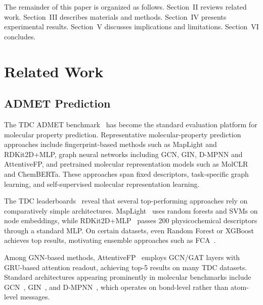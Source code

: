 \documentclass[journal]{IEEEtran}
\begin{document}
The remainder of this paper is organized as follows. Section~II reviews related work. Section~III describes materials and methods. Section~IV presents experimental results. Section~V discusses implications and limitations. Section~VI concludes.

\section{Related Work}
\label{sec:related}

\subsection{ADMET Prediction}

The TDC ADMET benchmark~\cite{huang2021therapeuticsdatacommonsmachine} has become the standard evaluation platform for molecular property prediction. Representative molecular-property prediction approaches include fingerprint-based methods such as MapLight and RDKit2D+MLP, graph neural networks including GCN, GIN, D-MPNN and AttentiveFP, and pretrained molecular representation models such as MolCLR and ChemBERTa. These approaches span fixed descriptors, task-specific graph learning, and self-supervised molecular representation learning.

The TDC leaderboards~\cite{tdc_admet_leaderboard} reveal that several top-performing approaches rely on comparatively simple architectures. MapLight~\cite{maplight} uses random forests and SVMs on node embeddings, while RDKit2D+MLP~\cite{rdkit2d_mlp} passes 200 physicochemical descriptors through a standard MLP. On certain datasets, even Random Forest or XGBoost achieves top results, motivating ensemble approaches such as FCA~\cite{cfa}.

Among GNN-based methods, AttentiveFP~\cite{attentiveFP} employs GCN/GAT layers with GRU-based attention readout, achieving top-5 results on many TDC datasets. Standard architectures appearing prominently in molecular benchmarks include GCN~\cite{kipf2017gcn}, GIN~\cite{xu2019gin}, and D-MPNN~\cite{yang2019dmpnn}, which operates on bond-level rather than atom-level messages.
\end{document}

